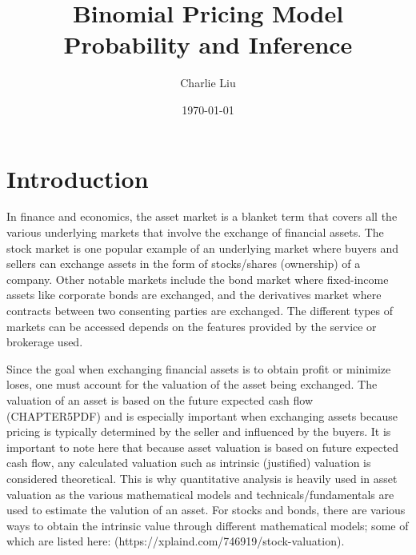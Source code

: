 \documentclass[12pt, letterpaper]{article}
\begin{document}
\title{Binomial Pricing Model \\
\large Probability and Inference}
\author{Charlie Liu}
\date{\today}
\maketitle

\section*{Introduction}

In finance and economics, the asset market is a blanket term that covers all the various underlying markets that involve the exchange of financial assets.
The stock market is one popular example of an underlying market where buyers and sellers can exchange assets in the form of stocks/shares (ownership) of a company.
Other notable markets include the bond market where fixed-income assets like corporate bonds are exchanged, and the derivatives market where contracts between two consenting parties are exchanged.
The different types of markets can be accessed depends on the features provided by the service or brokerage used.


Since the goal when exchanging financial assets is to obtain profit or minimize loses, one must account for the valuation of the asset being exchanged.
The valuation of an asset is based on the future expected cash flow (CHAPTER5PDF) and is especially important when exchanging assets because pricing is typically determined by the seller and influenced by the buyers.
It is important to note here that because asset valuation is based on future expected cash flow, any calculated valuation such as intrinsic (justified) valuation is considered theoretical.
This is why quantitative analysis is heavily used in asset valuation as the various mathematical models and technicals/fundamentals are used to estimate the valution of an asset.
For stocks and bonds, there are various ways to obtain the intrinsic value through different mathematical models; some of which are listed here: (https://xplaind.com/746919/stock-valuation).
\end{document}
